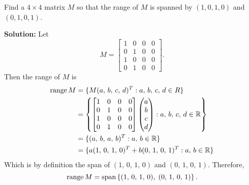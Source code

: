 Find a $4 \times 4$ matrix $M$ so that the range of $M$ is spanned by $(1,0,1,0)$ and $(0,1,0,1)$.\vspace{0.4in}
\begin{mybox}
    \textbf{Solution: } Let
    $$M = \begin{bmatrix} 
        1 & 0 & 0 & 0\\
        0 & 1 & 0 & 0\\
        1 & 0 & 0 & 0\\
        0 & 1 & 0 & 0
    \end{bmatrix}.$$
    Then the range of $M$ is
    \begin{align}
        \operatorname{range}M &= \{M(a,\,b,\,c,\,d)^T : a,\,b,\,c,\,d\in R\} \notag\\&=
         \left\{ \begin{bmatrix} 
            1 & 0 & 0 & 0\\
            0 & 1 & 0 & 0\\
            1 & 0 & 0 & 0\\
            0 & 1 & 0 & 0
        \end{bmatrix}
        \begin{pmatrix}
            a\\
            b\\
            c\\
            d
        \end{pmatrix} : a,\,b,\,c,\,d \in \mathbb{R} \right\} \notag\\
        &= \{ (a,\,b,\,a,\,b)^T : a,\,b \in \mathbb{R} \}\notag\\
        &= \{ a(1,\,0,\,1,\,0)^T + b(0,\,1,\,0,\,1)^T : a,\,b \in \mathbb{R} \}\notag
    \end{align}
    Which is by definition the span of $(1,\,0,\,1,\,0)$ and $(0,\,1,\,0,\,1)$. Therefore,
        $$\operatorname{range}M =  \operatorname{span}\left\{
            (1,\,0,\,1,\,0), \; (0,\,1,\,0,\,1)
        \right\}.\notag
    $$

\end{mybox}

